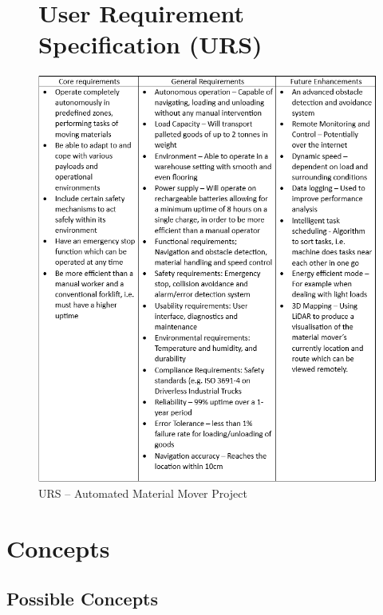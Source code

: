 \documentclass[12pt]{article}
\begin{document}
\begin{figure}[ht]
 
\section{User Requirement Specification (URS)}
    \centering
     \includegraphics[width=1.05\textwidth]{URS.png}
     \caption{URS – Automated Material Mover Project}
    \label{fig:URS}
\end{figure}
\FloatBarrier

\newpage
\section{Concepts}
\subsection{Possible Concepts}
 
\end{document}
